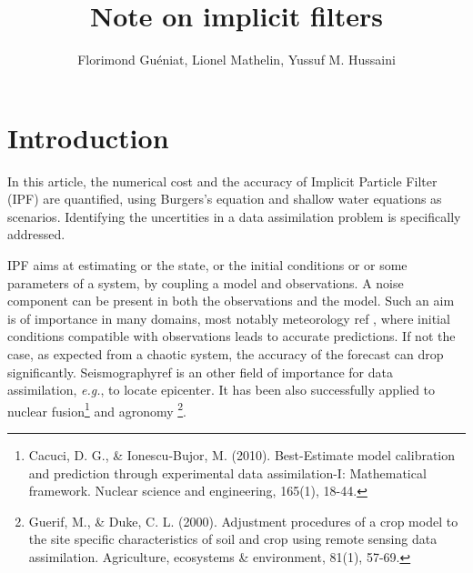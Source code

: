 \documentclass[10pt,openany,onecolumn,a4wide,pof]{article}
\newcommand{\todo}[1]{{\color{red} #1 }}
\begin{document}
%

\title{Note on implicit filters}

\author{Florimond Guéniat, Lionel Mathelin, Yussuf M. Hussaini}
%
%
%
%
%
%
%
%
%


\maketitle



%
\section{Introduction}
\label{sec-intro}

In this article, the numerical cost and the accuracy of Implicit Particle Filter (IPF) are quantified, using Burgers's equation and shallow water equations as scenarios.
Identifying the uncertities in a data assimilation problem is specifically addressed.

IPF aims at estimating or the state, or the initial conditions or or some parameters of a system, by coupling a model and observations. 
A noise component can be present in both the observations and the model. 
Such an aim is of importance in many domains, most notably meteorology\todo{ref}, where initial conditions compatible with observations leads to accurate predictions. 
If not the case, as expected from a chaotic system, the accuracy of the forecast can drop significantly.
Seismography{ref} is an other field of importance for data assimilation, \emph{e.g.}, to locate epicenter.
It has been also successfully applied to nuclear fusion\footnote{Cacuci, D. G., \& Ionescu-Bujor, M. (2010). Best-Estimate model calibration and prediction through experimental data assimilation-I: Mathematical framework. Nuclear science and engineering, 165(1), 18-44.} and agronomy \footnote{Guerif, M., \& Duke, C. L. (2000). Adjustment procedures of a crop model to the site specific characteristics of soil and crop using remote sensing data assimilation. Agriculture, ecosystems \& environment, 81(1), 57-69.}.
\end{document}
